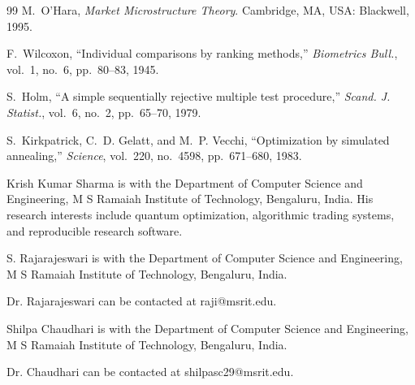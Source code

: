 \documentclass[journal]{IEEEtran}
\begin{document}
\begin{thebibliography}{99}
M.~O'Hara, \emph{Market Microstructure Theory}. Cambridge, MA, USA: Blackwell, 1995.

F.~Wilcoxon, ``Individual comparisons by ranking methods,'' \emph{Biometrics Bull.},
vol.~1, no.~6, pp.~80--83, 1945.

S.~Holm, ``A simple sequentially rejective multiple test procedure,'' \emph{Scand. J.
Statist.}, vol.~6, no.~2, pp.~65--70, 1979.

S.~Kirkpatrick, C.~D. Gelatt, and M.~P. Vecchi, ``Optimization by simulated annealing,''
\emph{Science}, vol.~220, no.~4598, pp.~671--680, 1983.

\end{thebibliography}

\begin{IEEEbiographynophoto}{Krish Kumar Sharma}
is with the Department of Computer Science and Engineering, M S Ramaiah Institute of
Technology, Bengaluru, India. His research interests include quantum optimization,
algorithmic trading systems, and reproducible research software.
\end{IEEEbiographynophoto}

\begin{IEEEbiographynophoto}{S. Rajarajeswari}
is with the Department of Computer Science and Engineering, M S Ramaiah Institute of
Technology, Bengaluru, India.

Dr. Rajarajeswari can be contacted at raji@msrit.edu.%
\end{IEEEbiographynophoto}

\begin{IEEEbiographynophoto}{Shilpa Chaudhari}
is with the Department of Computer Science and Engineering, M S Ramaiah Institute of
Technology, Bengaluru, India.

Dr. Chaudhari can be contacted at shilpasc29@msrit.edu.%
\end{IEEEbiographynophoto}
\end{document}
